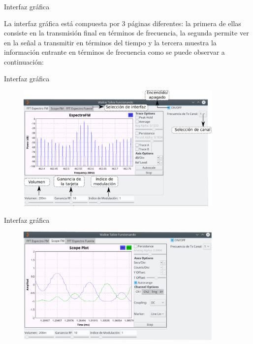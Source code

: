 \begin{frame}{Interfaz gráfica}

La interfaz gráfica está compuesta por 3 páginas diferentes: la primera de ellas consiste en la transmisión final en términos de frecuencia, la segunda permite ver en la señal a transmitir en términos del tiempo y la tercera muestra la información entrante en términos de frecuencia como se puede observar a continuación:

\end{frame}

\begin{frame}{Interfaz gráfica}

\begin{figure}[H]
\centering
\vspace{-3mm}
\includegraphics[width=0.9\textwidth]{parte3/lab14/pdf/Lab14_9.pdf}
\end{figure}

\end{frame}

\begin{frame}{Interfaz gráfica}

\begin{figure}[H]
\centering
\vspace{-3mm}
\includegraphics[width=0.9\textwidth]{parte3/lab14/pdf/Lab14_10.pdf}
\end{figure}

\end{frame}


